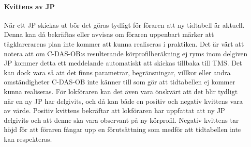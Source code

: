 \paragraph{Kvittens av JP}
När ett JP skickas ut bör det göras tydligt för föraren att ny tidtabell är aktuell.
Denna kan då bekräftas eller avvisas om föraren uppenbart märker att tågklarerarens plan inte kommer att kunna realiseras i praktiken.
Det är värt att notera att om C-DAS-OB:s resulterande körprofilberäkning ej ryms inom delgiven JP kommer detta ett meddelande automatiskt att skickas tillbaka till TMS.
Det kan dock vara så att det finns parametrar, begränsningar, villkor eller andra omständigheter C-DAS-OB inte känner till som gör att tidtabellen ej kommer kunna realiseras.
För lokföraren kan det även vara önskvärt att det blir tydligt när en ny JP har delgivits, och då kan både en positiv och negativ kvittens vara av värde.
Positiv kvittens bekräftar att lokföraren har uppfattat att ny JP delgivits och att denne ska vara observant på ny körprofil.
Negativ kvittens tar höjd för att föraren fångar upp en förutsättning som medför att tidtabellen inte kan respekteras.
